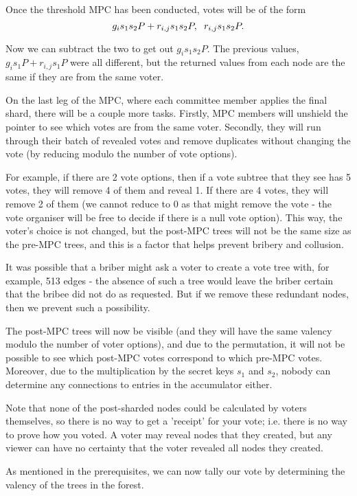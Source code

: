\documentclass{article}
\begin{document}
Once the threshold MPC has been conducted, votes will be of the form
$$ g_is_1s_2P + r_{i,j}s_1s_2P, \hspace{2mm}r_{i,j}s_1s_2P. $$

Now we can subtract the two to get out $g_is_1s_2P$. The previous values, $g_is_1P + r_{i,j}s_1P$ were all different, but the returned values from each node are the same if they are from the same voter.

On the last leg of the MPC, where each committee member applies the final shard, there will be a couple more tasks. Firstly, MPC members will unshield the pointer to see which votes are from the same voter. Secondly, they will run through their batch of revealed votes and remove duplicates without changing the vote (by reducing modulo the number of vote options).

For example, if there are 2 vote options, then if a vote subtree that they see has 5 votes, they will remove 4 of them and reveal 1. If there are 4 votes, they will remove 2 of them (we cannot reduce to 0 as that might remove the vote - the vote organiser will be free to decide if there is a null vote option). This way, the voter's choice is not changed, but the post-MPC trees will not be the same size as the pre-MPC trees, and this is a factor that helps prevent bribery and collusion.

It was possible that a briber might ask a voter to create a vote tree with, for example, 513 edges - the absence of such a tree would leave the briber certain that the bribee did not do as requested. But if we remove these redundant nodes, then we prevent such a possibility.

The post-MPC trees will now be visible (and they will have the same valency modulo the number of voter options), and due to the permutation, it will not be possible to see which post-MPC votes correspond to which pre-MPC votes. Moreover, due to the multiplication by the secret keys $s_1$ and $s_2$, nobody can determine any connections to entries in the accumulator either.

Note that none of the post-sharded nodes could be calculated by voters themselves, so there is no way to get a 'receipt' for your vote; i.e. there is no way to prove how you voted. A voter may reveal nodes that they created, but any viewer can have no certainty that the voter revealed all nodes they created.

As mentioned in the prerequisites, we can now tally our vote by determining the valency of the trees in the forest.
\end{document}
